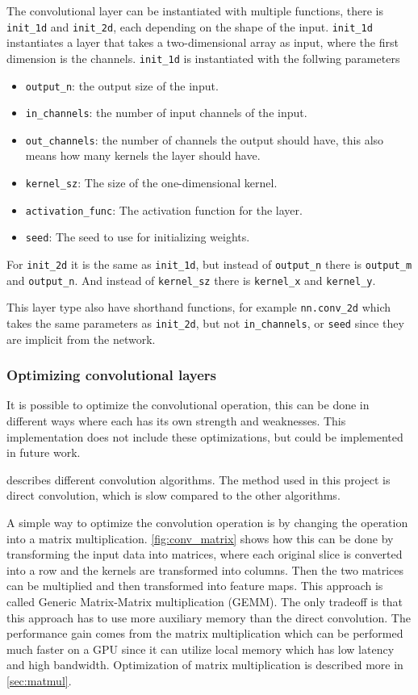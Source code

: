 The convolutional layer can be instantiated with multiple functions, there is \texttt{init\_1d} and \texttt{init\_2d}, each depending on the shape of the input.
\texttt{init\_1d} instantiates a layer that takes a two-dimensional array as input, where the first dimension is the channels.
\texttt{init\_1d} is instantiated with the follwing parameters
\begin{itemize}
    \item \texttt{output\_n}: the output size of the input.
    \item \texttt{in\_channels}: the number of input channels of the input.
    \item \texttt{out\_channels}: the number of channels the output should have, this also means how many kernels the layer should have.
    \item \texttt{kernel\_sz}: The size of the one-dimensional kernel.
    \item \texttt{activation\_func}: The activation function for the layer.
    \item \texttt{seed}: The seed to use for initializing weights.
\end{itemize}
For \texttt{init\_2d} it is the same as \texttt{init\_1d}, but instead of \texttt{output\_n} there is \texttt{output\_m} and \texttt{output\_n}. And instead of \texttt{kernel\_sz} there is \texttt{kernel\_x} and \texttt{kernel\_y}.

This layer type also have shorthand functions, for example \texttt{nn.conv\_2d} which takes the same parameters as \texttt{init\_2d}, but not \texttt{in\_channels}, or \texttt{seed} since they are implicit from the network.

\subsubsection*{Optimizing convolutional layers}%
\label{ssub:optimize_conv}

It is possible to optimize the convolutional operation, this can be done in different ways where each has its own strength and weaknesses.
This implementation does not include these optimizations, but could be implemented in future work.

\cite{perfomance_analysis_cnn} describes different convolution algorithms.
The method used in this project is direct convolution, which is slow compared to the other algorithms.

A simple way to optimize the convolution operation is by changing the operation into a matrix multiplication. \autoref{fig:conv_matrix} shows how this can be done by transforming the input data into matrices, where each original slice is converted into a row and the kernels are transformed into columns. Then the two matrices can be multiplied and then transformed into feature maps. This approach is called Generic Matrix-Matrix multiplication (GEMM). The only tradeoff is that this approach has to use more auxiliary memory than the direct convolution.
The performance gain comes from the matrix multiplication which can be performed much faster on a GPU since it can utilize local memory which has low latency and high bandwidth. Optimization of matrix multiplication is described more in \autoref{sec:matmul}.

